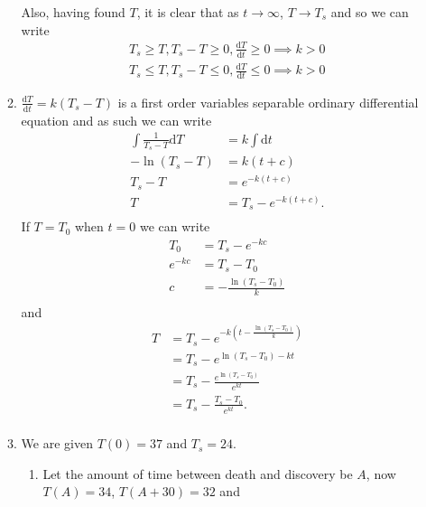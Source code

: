 \documentclass[10pt]{article}
\newcommand*{\dTdt}[0]{\frac{\text{d}T}{\text{d}t}}
\newcommand*{\dt}[0]{\text{d}t}
\newcommand*{\dT}[0]{\text{d}T}
\newcommand*{\df}[2]{\frac{\text{d}{#1}}{\text{d}{#2}}}%
\begin{document}
\begin{enumerate}
\begin{enumerate}
                Also, having found $T$, it is clear that as $t \rightarrow
                \infty$, $T \rightarrow T_s$ and so we can write
                \begin{align*}
                    T_s \geq T, T_s - T \geq 0, \dTdt \geq 0 \implies k > 0 \\
                    T_s \leq T, T_s - T \leq 0, \dTdt \leq 0 \implies k > 0
                \end{align*}
            \item $\df{T}{t} = k(T_s - T)$ is a first order variables separable
                ordinary differential equation and as such we can write
                \begin{align*}
                    \int\frac{1}{T_s - T}\dT &= k\int \dt \\
                    -\ln(T_s - T)&= k(t + c)  \\
                    T_s - T &=  e^{-k(t + c)}\\
                    T &= T_s - e^{-k(t+c)}. \\
                \end{align*}
            If $T = T_0$ when $t = 0$ we can write
                \begin{align*}
                    T_0 &= T_s - e^{-kc} \\
                    e^{-kc} &= T_s - T_0 \\
                    c &= -\frac{\ln(T_s - T_0)}{k} \\
                \end{align*}
                and
                \begin{align*}
                    T &= T_s - e^{-k\left(t-\tfrac{\ln(T_s - T_0)}{k}\right)} \\
                      &= T_s - e^{\ln(T_s - T_0)-kt} \\
                      &= T_s - \frac{e^{\ln(T_s - T_0)}}{e^{kt}} \\
                      &= T_s - \frac{T_s - T_0}{e^{kt}}. \\
                \end{align*}
            \item We are given $T(0) = 37$ and $T_s = 24$. 
                \begin{enumerate}
                    \item Let the amount of time between death and discovery be
                        $A$, now $T(A) = 34$, $T(A + 30) = 32$ and
                    \begin{align*}

\end{align*}
\end{enumerate}
\end{enumerate}
\end{enumerate}
\end{document}
